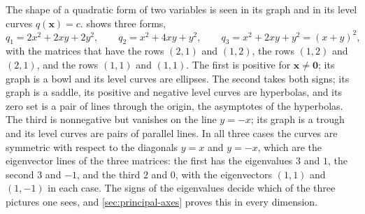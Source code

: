 The shape of a quadratic form of two variables is seen in its graph and in its level curves $q(\mathbf x)=c$.  shows three forms,
\begin{equation}
q_1=2x^2+2xy+2y^2,\qquad q_2=x^2+4xy+y^2,\qquad q_3=x^2+2xy+y^2=(x+y)^2 ,
\label{eq:three-forms}
\end{equation}
with the matrices that have the rows $(2,1)$ and $(1,2)$, the rows $(1,2)$ and $(2,1)$, and the rows $(1,1)$ and $(1,1)$. The first is positive for $\mathbf x\ne\mathbf 0$; its graph is a bowl and its level curves are ellipses. The second takes both signs; its graph is a saddle, its positive and negative level curves are hyperbolas, and its zero set is a pair of lines through the origin, the asymptotes of the hyperbolas. The third is nonnegative but vanishes on the line $y=-x$; its graph is a trough and its level curves are pairs of parallel lines. In all three cases the curves are symmetric with respect to the diagonals $y=x$ and $y=-x$, which are the eigenvector lines of the three matrices: the first has the eigenvalues $3$ and $1$, the second $3$ and $-1$, and the third $2$ and $0$, with the eigenvectors $(1,1)$ and $(1,-1)$ in each case. The signs of the eigenvalues decide which of the three pictures one sees, and \cref{sec:principal-axes} proves this in every dimension.

